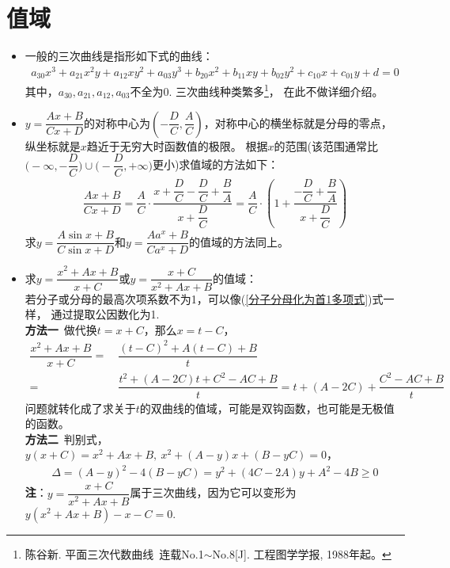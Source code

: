 \section{值域} 
\begin{itemize}[leftmargin=\inteval{\myitemleftmargin}pt,itemsep=
   \inteval{\myitemitempsep}pt,topsep=\inteval{\myitemtopsep}pt]
\item 一般的三次曲线是指形如下式的曲线：
\begin{gather*}
    a_{30}x^3+a_{21}x^2y+a_{12}xy^2+a_{03}y^3+b_{20}x^2+b_{11}xy+b_{02}y^2+
    c_{10}x+c_{01}y+d=0
\end{gather*}
其中，$ a_{30},a_{21},a_{12},a_{03} $不全为0. 三次曲线种类繁多\footnote{陈谷新. 
    平面三次代数曲线\ 连载No.1$ \sim $No.8[J]. 工程图学学报, 1988年起。}，
在此不做详细介绍。

\item $ y=\dfrac{Ax+B}{Cx+D} $的对称中心为$\left(-\dfrac{D}{C},
\dfrac{A}{C}\right)$，对称中心的横坐标就是分母的零点，
纵坐标就是$x$趋近于无穷大时函数值的极限。
根据$x$的范围(该范围通常比$\Big(-\infty,-\dfrac{D}{C}\Big)\cup
\Big(-\dfrac{D}{C},+\infty\Big)$更小)求值域的方法如下：
\begin{align}\label{分子分母化为首1多项式}
    \dfrac{Ax+B}{Cx+D} =
    \dfrac{A}{C}\cdot\dfrac{x+\dfrac{D}{C}-\dfrac{D}{C}+\dfrac{B}{A}}
    {x+\dfrac{D}{C}}=\dfrac{A}{C}\cdot
    \left(1+\dfrac{-\dfrac{D}{C}+\dfrac{B}{A}}{x+\dfrac{D}{C}}\right)
\end{align}
求$ y=\dfrac{A\sin x+B}{C\sin x+D}$和$ y=\dfrac{Aa^x+B}{Ca^x+D}$的值域的方法同上。

\item 求$ y=\dfrac{x^2+Ax+B}{x+C} $或$ y=\dfrac{x+C}{x^2+Ax+B} $的值域：\\
若分子或分母的最高次项系数不为1，可以像(\ref{分子分母化为首1多项式})式一样，
通过提取公因数化为1. \\
\textbf{方法一}\ 做代换$ t=x+C $，那么$ x=t-C $，
\begin{align*}
    \dfrac{x^2+Ax+B}{x+C}=&\ \dfrac{(t-C)^2+A(t-C)+B}{t}\\
    =&\ \dfrac{t^2+(A-2C)t+C^2-AC+B}{t}=t+(A-2C)+\dfrac{C^2-AC+B}{t}
\end{align*}
问题就转化成了求关于$ t $的双曲线的值域，可能是双钩函数，也可能是无极值的函数。\\
\textbf{方法二}\ 判别式，$ y(x+C)=x^2+Ax+B,\ x^2+(A-y)x+(B-yC)=0 $，
\begin{align*}
    \Delta=(A-y)^2-4(B-yC)=y^2+(4C-2A)y+A^2-4B\geq 0 
\end{align*}
\textbf{注}：$ y=\dfrac{x+C}{x^2+Ax+B} $属于三次曲线，因为它可以变形为$ y(x^2+Ax+B)-x-C=0 $. 


\end{itemize}
